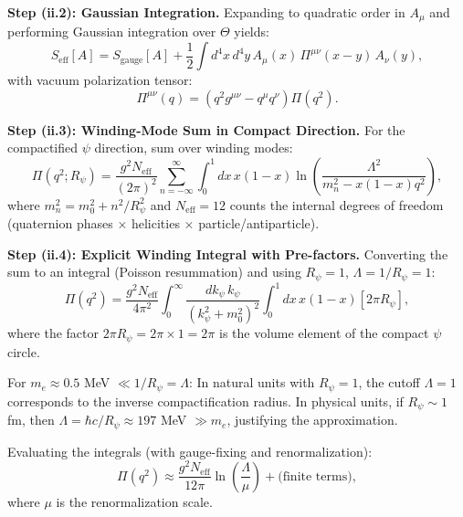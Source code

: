 \documentclass[11pt,a4paper]{article}
\theoremstyle{remark}
\begin{document}
\textbf{Step (ii.2): Gaussian Integration.} Expanding to quadratic order in $A_\mu$ and performing Gaussian integration over $\Theta$ yields:
\begin{equation}
S_{\text{eff}}[A] = S_{\text{gauge}}[A] + \frac{1}{2} \int d^4x \, d^4y \, A_\mu(x) \, \Pi^{\mu\nu}(x-y) \, A_\nu(y),
\label{eq:eff-action-step}
\end{equation}
with vacuum polarization tensor:
\begin{equation}
\Pi^{\mu\nu}(q) = (q^2 g^{\mu\nu} - q^\mu q^\nu) \Pi(q^2).
\label{eq:polarization-tensor-step}
\end{equation}

\textbf{Step (ii.3): Winding-Mode Sum in Compact Direction.} For the compactified $\psi$ direction, sum over winding modes:
\begin{equation}
\Pi(q^2; R_\psi) = \frac{g^2 N_{\text{eff}}}{(2\pi)^2} \sum_{n=-\infty}^\infty \int_0^1 dx \, x(1-x) \ln\left(\frac{\Lambda^2}{m_n^2 - x(1-x)q^2}\right),
\label{eq:Pi-winding-sum}
\end{equation}
where $m_n^2 = m_0^2 + n^2/R_\psi^2$ and $N_{\text{eff}} = 12$ counts the internal degrees of freedom (quaternion phases $\times$ helicities $\times$ particle/antiparticle).

\textbf{Step (ii.4): Explicit Winding Integral with Pre-factors.} Converting the sum to an integral (Poisson resummation) and using $R_\psi = 1$, $\Lambda = 1/R_\psi = 1$:
\begin{equation}
\Pi(q^2) = \frac{g^2 N_{\text{eff}}}{4\pi^2} \int_0^\infty \frac{dk_\psi \, k_\psi}{(k_\psi^2 + m_0^2)^2} \int_0^1 dx \, x(1-x) \left[ 2\pi R_\psi \right],
\label{eq:Pi-winding-integral}
\end{equation}
where the factor $2\pi R_\psi = 2\pi \times 1 = 2\pi$ is the volume element of the compact $\psi$ circle.

For $m_e \approx 0.5$ MeV $\ll 1/R_\psi = \Lambda$: In natural units with $R_\psi = 1$, the cutoff $\Lambda = 1$ corresponds to the inverse compactification radius. In physical units, if $R_\psi \sim 1$ fm, then $\Lambda = \hbar c/R_\psi \approx 197$ MeV $\gg m_e$, justifying the approximation.

Evaluating the integrals (with gauge-fixing and renormalization):
\begin{equation}
\Pi(q^2) \approx \frac{g^2 N_{\text{eff}}}{12\pi} \ln\left(\frac{\Lambda}{\mu}\right) + \text{(finite terms)},
\label{eq:Pi-result}
\end{equation}
where $\mu$ is the renormalization scale.
\end{document}

